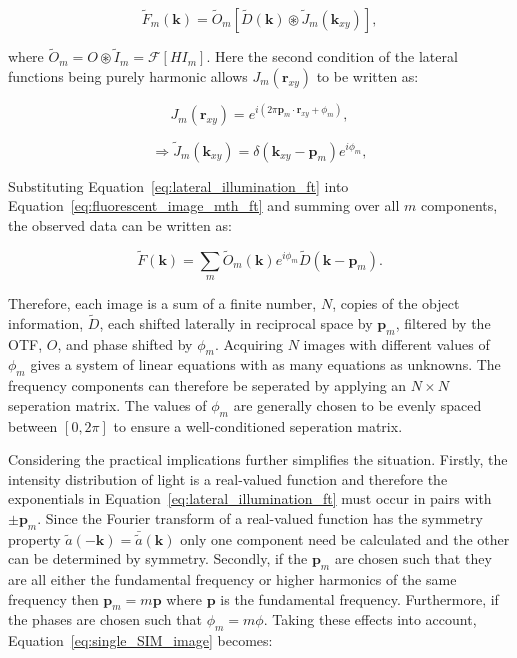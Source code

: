 \begin{equation}\label{eq:fluorescent_image_mth_ft}
\tilde{F}_{m}(\textbf{k}) = \tilde{O}_{m}\left[\tilde{D}(\textbf{k}) \circledast \tilde{J}_{m}(\textbf{k}_{xy})\right],
\end{equation}

where $\tilde{O}_{m} = O \circledast \tilde{I}_{m} = \mathcal{F}[HI_{m}]$.
Here the second condition of the lateral functions being purely harmonic allows
$J_{m}(\textbf{r}_{xy})$ to be written as:

\begin{equation}\label{eq:lateral_illumination}
	J_{m}(\textbf{r}_{xy}) = e^{i\left(2\pi\textbf{p}_m\cdot\textbf{r}_{xy} + \phi_{m}\right)},
\end{equation}

\begin{equation}\label{eq:lateral_illumination_ft}
\Rightarrow \tilde{J}_{m}(\textbf{k}_{xy}) = \delta\left(\textbf{k}_{xy} - \textbf{p}_m\right)e^{i\phi_{m}},
\end{equation}

Substituting Equation~\ref{eq:lateral_illumination_ft} into 
Equation~\ref{eq:fluorescent_image_mth_ft} and summing over all $m$ components,
the observed data can be written as:

\begin{equation}\label{eq:single_SIM_image}
\tilde{F}(\textbf{k}) = \sum\limits_{m}{\tilde{O}_{m}(\textbf{k})e^{i\phi_{m}}\tilde{D}\left(\textbf{k} - \textbf{p}_m\right)}.
\end{equation}

Therefore, each image is a sum of a finite number, $N$, copies of the object 
information, $\tilde{D}$, each shifted laterally in reciprocal space by 
$\textbf{p}_{m}$, filtered by the OTF, $O$, and phase shifted by $\phi_{m}$.
Acquiring $N$ images with different values of $\phi_{m}$ gives a system of 
linear equations with as many equations as unknowns. The frequency components
can therefore be seperated by applying an $N\times N$ seperation matrix. The 
values of $\phi_{m}$ are generally chosen to be evenly spaced between 
$[0,2\pi]$ to ensure a well-conditioned seperation 
matrix\cite{gustafsson2008three}.

Considering the practical implications further simplifies the situation. 
Firstly, the intensity distribution of light is a real-valued function and
therefore the exponentials in Equation~\ref{eq:lateral_illumination_ft} must
occur in pairs with $\pm\textbf{p}_{m}$. Since the Fourier transform of a 
real-valued function has the symmetry property $\tilde{a}(-\textbf{k}) = 
\bar{\tilde{a}}(\textbf{k})$ only one component need be calculated and the
other can be determined by symmetry. Secondly, if the $\textbf{p}_{m}$ are
chosen such that they are all either the fundamental frequency or higher 
harmonics of the same frequency then $\textbf{p}_{m} = m\textbf{p}$ where
$\textbf{p}$ is the fundamental frequency. Furthermore, if the phases are 
chosen such that $\phi_{m} = m\phi$. Taking these effects into account, 
Equation~\ref{eq:single_SIM_image} becomes:

